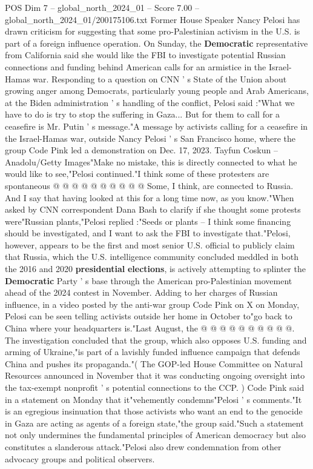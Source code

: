 \begin{textsample}{POS Dim 7 – global\_north\_2024\_01 – Score 7.00 – global\_north\_2024\_01/200175106.txt}  \label{ex:f7_pos_195}
Former House Speaker Nancy Pelosi has drawn criticism for suggesting that some pro-Palestinian activism in the U.S. is part of a foreign influence operation.
On Sunday, the \textbf{Democratic} representative from California said she would like the FBI to investigate potential Russian connections and funding behind American calls for an armistice in the Israel-Hamas war.
Responding to a question on CNN ' s State of the Union about growing anger among Democrats, particularly young people and Arab Americans, at the Biden administration ' s handling of the conflict, Pelosi said :"What we have to do is try to stop the suffering in Gaza...
But for them to call for a ceasefire is Mr.
Putin ' s message."A message by activists calling for a ceasefire in the Israel-Hamas war, outside Nancy Pelosi ' s San Francisco home, where the group Code Pink led a demonstration on Dec. 17, 2023.
Tayfun Coskun -- Anadolu/Getty Images"Make no mistake, this is directly connected to what he would like to see,"Pelosi continued."I think some of these protesters are spontaneous @ @ @ @ @ @ @ @ @ @ Some, I think, are connected to Russia.
And I say that having looked at this for a long time now, as you know."When asked by CNN correspondent Dana Bash to clarify if she thought some protests were"Russian plants,"Pelosi replied :"Seeds or plants -- I think some financing should be investigated, and I want to ask the FBI to investigate that."Pelosi, however, appears to be the first and most senior U.S. official to publicly claim that Russia, which the U.S. intelligence community concluded meddled in both the 2016 and 2020 \textbf{presidential} \textbf{elections}, is actively attempting to splinter the \textbf{Democratic} Party ' s base through the American pro-Palestinian movement ahead of the 2024 contest in November.
Adding to her charges of Russian influence, in a video posted by the anti-war group Code Pink on X on Monday, Pelosi can be seen telling activists outside her home in October to"go back to China where your headquarters is."Last August, the @ @ @ @ @ @ @ @ @ @.
The investigation concluded that the group, which also opposes U.S. funding and arming of Ukraine,"is part of a lavishly funded influence campaign that defends China and pushes its propaganda."( The GOP-led House Committee on Natural Resources announced in November that it was conducting ongoing oversight into the tax-exempt nonprofit ' s potential connections to the CCP. ) Code Pink said in a statement on Monday that it"vehemently condemns"Pelosi ' s comments."It is an egregious insinuation that those activists who want an end to the genocide in Gaza are acting as agents of a foreign state,"the group said."Such a statement not only undermines the fundamental principles of American democracy but also constitutes a slanderous attack."Pelosi also drew condemnation from other advocacy groups and political observers.

\end{textsample}
